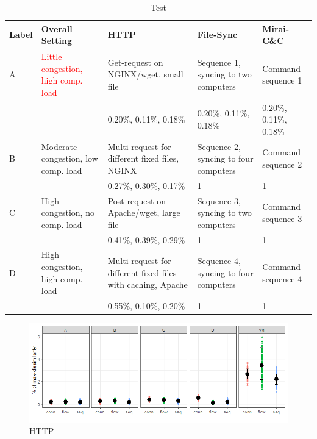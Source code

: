 \documentclass{article}
\begin{document}
\begin{table}
\centering
\begin{tabular}{p{0.8cm}|p{2.5cm}|p{2.7cm}|p{2.7cm}|p{2.7cm}}
Label &Overall Setting&HTTP&File-Sync & Mirai-C\&C\\ \hline
A&\textcolor{red}{Little congestion, high comp. load} & Get-request on NGINX/wget, small file & Sequence 1,  syncing to two computers & Command sequence 1 \\ \hline
 &&\footnotesize \textcolor{myred}{0.20\%}, \textcolor{mygreen}{0.11\%}, \textcolor{myblue}{0.18\%}&\footnotesize \textcolor{myred}{0.20\%}, \textcolor{mygreen}{0.11\%}, \textcolor{myblue}{0.18\%}&\footnotesize \textcolor{myred}{0.20\%}, \textcolor{mygreen}{0.11\%}, \textcolor{myblue}{0.18\%}\\ \hline \hline
B& Moderate congestion, low comp. load &Multi-request for different fixed files, NGINX & Sequence 2,  syncing to four computers & Command sequence 2\\ \hline
 &&\footnotesize \textcolor{myred}{0.27\%}, \textcolor{mygreen}{0.30\%}, \textcolor{myblue}{0.17\%}&1&1\\ \hline \hline
C& High congestion, no comp. load & Post-request on Apache/wget, large file &Sequence 3,  syncing to two computers & Command sequence 3\\ \hline
 &&\footnotesize \textcolor{myred}{0.41\%}, \textcolor{mygreen}{0.39\%}, \textcolor{myblue}{0.29\%}&1&1\\ \hline \hline
D& High congestion, high comp. load & Multi-request for different fixed files with caching, Apache & Sequence 4,  syncing to four computers & Command sequence 4\\ \hline
 &&\footnotesize \textcolor{myred}{0.55\%}, \textcolor{mygreen}{0.10\%}, \textcolor{myblue}{0.20\%}&1&1\\ \hline \hline
\end{tabular}
\caption{Test}\label{Dataset}
\end{table}


\begin{figure}
\centering
\includegraphics[width=1\textwidth]{images/Exp1.png}
\caption{HTTP}\label{determ-metric}
\end{figure}
\end{document}
